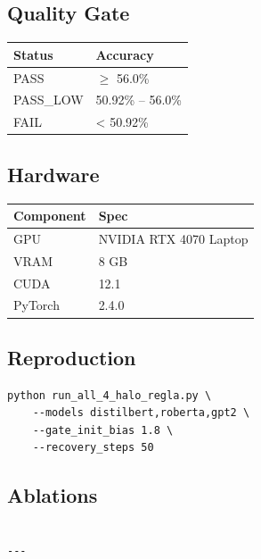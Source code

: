 \subsection{Quality Gate}

\begin{table}[H]
\centering
\small
\begin{tabular}{ll}
\toprule
\textbf{Status} & \textbf{Accuracy} \\
\midrule
PASS & $\ge$ 56.0\% \\
PASS\_LOW & 50.92\% -- 56.0\% \\
FAIL & < 50.92\% \\
\bottomrule
\end{tabular}
\end{table}

\subsection{Hardware}

\begin{table}[H]
\centering
\small
\begin{tabular}{ll}
\toprule
\textbf{Component} & \textbf{Spec} \\
\midrule
GPU & NVIDIA RTX 4070 Laptop \\
VRAM & 8 GB \\
CUDA & 12.1 \\
PyTorch & 2.4.0 \\
\bottomrule
\end{tabular}
\end{table}

\subsection{Reproduction}

\begin{lstlisting}
python run_all_4_halo_regla.py \
    --models distilbert,roberta,gpt2 \
    --gate_init_bias 1.8 \
    --recovery_steps 50
\end{lstlisting}

\subsection{Ablations}

\begin{lstlisting}

---
\end{lstlisting}